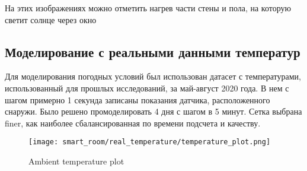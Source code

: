 На этих изображениях можно отметить нагрев части стены и пола, на которую светит солнце через окно

\newpage


\subsection{Моделирование с реальными данными температур}

Для моделирования погодных условий был использован датасет с температурами, использованный для прошлых исследований, за май-август 2020 года. В нем с шагом примерно 1 секунда записаны показания датчика, расположенного снаружи. Было решено промоделировать 4 дня с шагом в 5 минут. Сетка выбрана finer, как наиболее сбалансированная по времени подсчета и качеству.

\begin{figure}[H]
\texttt{[image: smart\_room/real\_temperature/temperature\_plot.png]}
\caption{Ambient temperature plot}
\end{figure}





































